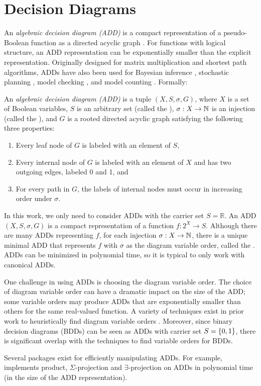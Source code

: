 \section{Decision Diagrams}
\label{sec:background:dd}
An \emph{algebraic decision diagram (ADD)} is a compact representation of a pseudo-Boolean function as a directed acyclic graph \cite{bahar1997algebraic}.
For functions with logical structure, an ADD representation can be exponentially smaller than the explicit representation.
Originally designed for matrix multiplication and shortest path algorithms, ADDs have also been used for Bayesian inference \cite{chavira2007compiling,gogate2011approximation}, stochastic planning \cite{hoey1999spudd}, model checking \cite{kwiatkowska2007stochastic}, and model counting \cite{fargier2014knowledge,DPV20}. Formally:

\begin{definition}
\label{def:add}
An \emph{algebraic decision diagram (ADD)} is a tuple $(X, S, \sigma, G)$, where $X$ is a set of Boolean variables, $S$ is an arbitrary set (called the ), $\sigma: X \to \mathbb{N}$ is an injection (called the ), and $G$ is a rooted directed acyclic graph satisfying the following three properties:
\begin{enumerate}
    \item Every leaf node of $G$ is labeled with an element of $S$,
    \item Every internal node of $G$ is labeled with an element of $X$ and has two outgoing edges, labeled 0 and 1, and
    \item For every path in $G$, the labels of internal nodes must occur in increasing order under $\sigma$.
\end{enumerate}
\end{definition}
In this work, we only need to consider ADDs with the carrier set $S = \mathbb{R}$. 
An ADD $(X, S, \sigma, G)$ is a compact representation of a function $f: 2^X \to S$.
Although there are many ADDs representing $f$, for each injection $\sigma: X \to \mathbb{N}$, there is a unique minimal ADD that represents $f$ with $\sigma$ as the diagram variable order, called the .
ADDs can be minimized in polynomial time, so it is typical to only work with canonical ADDs.

One challenge in using ADDs is choosing the diagram variable order.
The choice of diagram variable order can have a dramatic impact on the size of the ADD; some variable orders may produce ADDs that are exponentially smaller than others for the same real-valued function.
A variety of techniques exist in prior work to heuristically find diagram variable orders \cite{tarjan1984simple,koster2001treewidth,dechter03}.
Moreover, since binary decision diagrams (BDDs) \cite{bryant1986graph} can be seen as ADDs with carrier set $S = \left\{ 0, 1 \right\}$, there is significant overlap with the techniques to find variable orders for BDDs.

Several packages exist for efficiently manipulating ADDs.
For example, \cudd{} \cite{somenzi2015cudd} implements product, $\Sigma$-projection and $\exists$-projection on ADDs in polynomial time (in the size of the ADD representation).